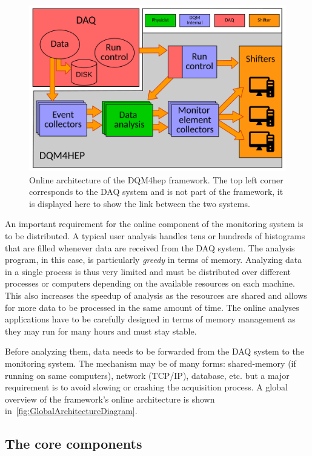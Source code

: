 \documentclass{webofc}
\begin{document}
\begin{figure}[!h]
  \centering
  \includegraphics[width=.95\textwidth]{figs/AnalysisModuleArchitecture.pdf}
  \caption{Online architecture of the DQM4hep framework. The top left corner corresponds to the DAQ system and is not part
  of the framework, it is displayed here to show the link between the two systems.}
  \label{fig:GlobalArchitectureDiagram}
\end{figure}

An important requirement for the online component of the monitoring system is to be distributed.
A typical user analysis handles tens or hundreds of histograms that are filled whenever data are received from the DAQ system.
The analysis program, in this case, is particularly \textit{greedy} in terms of memory.
Analyzing data in a single process is thus very limited and must be distributed over different processes or computers depending on the available resources on each machine.
This also increases the speedup of analysis as the resources are shared and allows for more data to be processed in the same amount of time.
The online analyses applications have to be carefully designed in terms of memory management as they may run for many hours and must stay stable.

Before analyzing them, data needs to be forwarded from the DAQ system to the monitoring system.
The mechanism may be of many forms: shared-memory (if running on same computers), network (TCP/IP), database, etc. but a major requirement is to avoid slowing or crashing the acquisition process.
A global overview of the framework's online architecture is shown in~\autoref{fig:GlobalArchitectureDiagram}.

\subsection{The core components}
\label{subsec:core}
\end{document}
